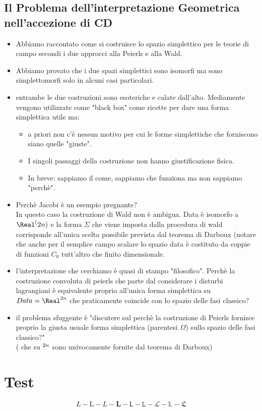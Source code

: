 \documentclass[Main]{subfiles}
\begin{document}
	\section{Il Problema dell'interpretazione Geometrica nell'accezione di CD}
		\begin{itemize}
				\item Abbiamo raccontato come si costruisce lo spazio simplettico per le teorie di campo secondi i due approcci alla Peierls e alla Wald.
				\item  Abbiamo provato che i due spazi simplettici sono isomorfi ma sono simplettomorfi solo in alcuni casi particolari.
				\item entrambe le due costruzioni sono esoteriche e calate dall'alto. 
					Mediamente vengono utilizzate come "black box" come ricette per dare una forma simplettica utile ma:
				\begin{itemize}
					\item a priori non c'è nessun motivo per cui le forme simplettiche che forniscono siano quelle "giuste".
					\item I singoli passaggi della costruzione non hanno giustificazione fisica.
					\item 	In breve: sappiamo il come, sappiamo che funziona ma non sappiamo "perchè".
				\end{itemize}

			\item Perchè Jacobi è un esempio pregnante?\\
				In questo caso la costruzione di Wald non è ambigua. Data è isomorfo a $\Real^(2n)$ e la forma $\Sigma$ che viene imposta dalla procedura di wald corrisponde all'unica scelta possibile prevista dal teorema di Darboux (notare che anche per il semplice campo scalare lo spazio data è costituto da coppie di funzioni $C_0$ tutt'altro che finito dimensionale.
			\item l'interpretazione che cerchiamo è quasi di stampo "filosofico". Perchè la costruzione convoluta di peierls che parte dal considerare i disturbi lagrangiani è equivalente proprio all'unica forma simplettica su $Data=\Real^{2n}$ che praticamente coincide con lo spazio delle fasi classico?
			\item il problema sfuggente è "discutere sul perchè la costruzione di Peierls fornisce proprio la giusta usuale forma simplettica (parentesi $\Omega$) sullo spazio delle fasi classico?"\\
			( che su $\real^{2n} $ sono univocamente fornite dal teorema di Darboux)
				
		\end{itemize}
		
\chapter{Test}
	$$L - \mathrm{L} - \mathit{L}  - \mathbf{L} - \mathsf{L} - \mathtt{L}- \mathcal{L}- \mathbb{L}- \mathfrak{L}$$
\end{document}
